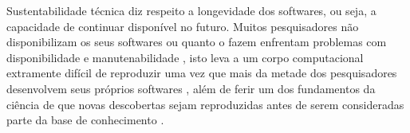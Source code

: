 Sustentabilidade técnica diz respeito a longevidade dos softwares, ou seja, a
capacidade de continuar disponível no futuro. Muitos pesquisadores não
disponibilizam os seus softwares \cite{robles2010replicating,
amann2015software} ou quanto o fazem enfrentam problemas com disponibilidade e
manutenabilidade \cite{Prlic2012}, isto leva a um corpo computacional
extramente difícil de reproduzir uma vez que mais da metade dos pesquisadores
desenvolvem seus próprios softwares \cite{hettrick_2014_14809}, além de ferir um dos
fundamentos da ciência de que novas descobertas sejam reproduzidas antes de
serem consideradas parte da base de conhecimento \cite{Stodden2009}.

%
%
%
%

